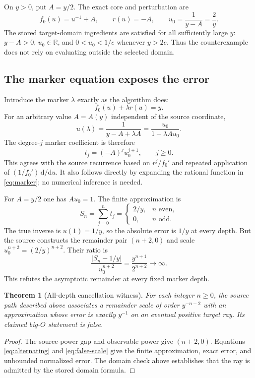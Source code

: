 \documentclass[11pt,a4paper]{article}
\newtheorem{theorem}{Theorem}[section]
\theoremstyle{remark}\newtheorem{remark}[theorem]{Remark}
\newcommand{\R}{\mathbb R}
\begin{document}
On $y>0$, put $A=y/2$. The exact core and perturbation are
\[
 f_0(u)=u^{-1}+A,\qquad r(u)=-A,
 \qquad u_0=\frac1{y-A}=\frac2y.
\]
The stored target-domain ingredients are satisfied for all sufficiently large
$y$: $y-A>0$, $u_0\in\R$, and $0<u_0<1/e$ whenever $y>2e$.
Thus the counterexample does not rely on evaluating outside the selected domain.

\subsection{The marker equation exposes the error}

Introduce the marker $\lambda$ exactly as the algorithm does:
\[
 f_0(u)+\lambda r(u)=y.
\]
For an arbitrary value $A=A(y)$ independent of the source coordinate,
\begin{equation}
 u(\lambda)=\frac1{y-A+\lambda A}
 =\frac{u_0}{1+\lambda A u_0}.
 \label{eq:marker}
\end{equation}
The degree-$j$ marker coefficient is therefore
\begin{equation}
 t_j=(-A)^j u_0^{j+1},\qquad j\geq0.
 \label{eq:marker-coefficient}
\end{equation}
This agrees with the source recurrence based on $r^j/f_0'$ and repeated
application of $(1/f_0')\,\mathrm d/\mathrm du$. It also follows directly by
expanding the rational function in \cref{eq:marker}; no numerical inference is
needed.

For $A=y/2$ one has $A u_0=1$. The finite approximation is
\begin{equation}
 S_n=\sum_{j=0}^{n}t_j
 =\begin{cases}2/y,&n\text{ even},\\0,&n\text{ odd}.\end{cases}
 \label{eq:alternating}
\end{equation}
The true inverse is $u(1)=1/y$, so the absolute error is $1/y$ at every depth.
But the source constructs the remainder pair $(n+2,0)$ and scale
$u_0^{n+2}=(2/y)^{n+2}$. Their ratio is
\begin{equation}
 \frac{|S_n-1/y|}{u_0^{n+2}}
 =\frac{y^{n+1}}{2^{n+2}}\longrightarrow\infty.
 \label{eq:false-scale}
\end{equation}
This refutes the asymptotic remainder at every fixed marker depth.

\begin{theorem}[All-depth cancellation witness]
For each integer $n\geq0$, the source path described above associates a remainder
scale of order $y^{-n-2}$ with an approximation whose error is exactly $y^{-1}$
on an eventual positive target ray. Its claimed big-$O$ statement is false.
\end{theorem}
\begin{proof}
The source-power gap and observable power give $(n+2,0)$. Equations
\eqref{eq:alternating} and \eqref{eq:false-scale} give the finite approximation,
exact error, and unbounded normalized error. The domain check above establishes
that the ray is admitted by the stored domain formula.
\end{proof}
\end{document}
